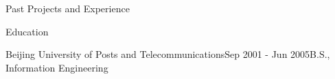 \documentclass{resume} %
\begin{document}
\begin{rSection}{Past Projects and Experience}
\begin{rSection}{Education}
\begin{rSubsection}{Beijing University of Posts and Telecommunications}{Sep 2001 - Jun 2005}{B.S., Information Engineering}{}
\end{rSubsection}

\end{rSection}






%
%



\end{rSection}

\thispagestyle{fancy}
\end{document}
